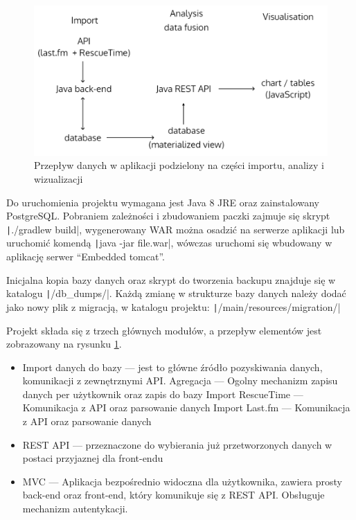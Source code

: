 \documentclass[openright]{xmgr}
\begin{document}
    \begin{figure}
        \includegraphics[width=\linewidth]{fig/data-flow.png}
        \caption{Przepływ danych w aplikacji podzielony na części importu, analizy i wizualizacji}
        \label{fig:data-flow}
    \end{figure}

    Do uruchomienia projektu wymagana jest Java 8 JRE oraz zainstalowany PostgreSQL.
    Pobraniem zależności i zbudowaniem paczki zajmuje się skrypt \texttt|./gradlew build|,
    wygenerowany WAR można osadzić na serwerze aplikacji lub uruchomić komendą \texttt|java -jar file.war|,
    wówczas uruchomi się wbudowany w aplikację serwer ``Embedded tomcat''.

    Inicjalna kopia bazy danych oraz skrypt do tworzenia backupu
    znajduje się w katalogu \texttt|/db_dumps/|.
    Każdą zmianę w strukturze bazy danych należy dodać jako nowy plik z migracją, w katalogu projektu:
    \texttt|/main/resources/migration/|

    Projekt składa się z trzech głównych modułów, a przepływ elementów jest zobrazowany na rysunku \ref{fig:data-flow}.
    \begin{itemize}
        \item Import danych do bazy --- jest to główne źródło pozyskiwania danych, komunikacji z zewnętrznymi API.
            \subitem Agregacja --- Ogolny mechanizm zapisu danych per użytkownik oraz zapis do bazy
            \subitem Import RescueTime --- Komunikacja z API oraz parsowanie danych
            \subitem Import Last.fm --- Komunikacja z API oraz parsowanie danych
        \item REST API --- przeznaczone do wybierania już przetworzonych danych w postaci przyjaznej dla front-endu
        \item MVC --- Aplikacja bezpośrednio widoczna dla użytkownika,
                zawiera prosty back-end oraz front-end, który komunikuje się z REST API.
                Obsługuje mechanizm autentykacji.
    \end{itemize}
\end{document}
